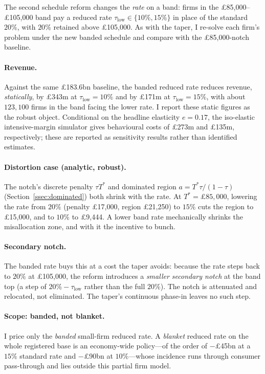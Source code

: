 The second schedule reform changes the \emph{rate} on a band: firms in the
\pounds85{,}000--\pounds105{,}000 band pay a reduced rate
$\tau_{\text{low}}\in\{10\%,15\%\}$ in place of the standard $20\%$, with $20\%$
retained above \pounds105{,}000. As with the taper, I re-solve each firm's
problem under the new banded schedule and compare with the \pounds85{,}000-notch
baseline.

\paragraph{Revenue.} Against the same \pounds183.6bn baseline, the banded reduced
rate reduces revenue, \emph{statically}, by \pounds343m at
$\tau_{\text{low}}=10\%$ and by \pounds171m at $\tau_{\text{low}}=15\%$, with
about $123{,}100$ firms in the band facing the lower rate. I report these static
figures as the robust object. Conditional on the headline elasticity $e=0.17$, the
iso-elastic intensive-margin simulator gives behavioural costs of \pounds273m and
\pounds135m, respectively; these are reported as sensitivity results rather than
identified estimates.

\paragraph{Distortion case (analytic, robust).} The notch's discrete penalty
$\tau T^{*}$ and dominated region $a=T^{*}\tau/(1-\tau)$
(Section~\ref{ssec:dominated}) both shrink with the rate. At
$T^{*}=\pounds85{,}000$, lowering the rate from $20\%$ (penalty \pounds17{,}000,
region \pounds21{,}250) to $15\%$ cuts the region to \pounds15{,}000, and to
$10\%$ to \pounds9{,}444. A lower band rate mechanically shrinks the misallocation
zone, and with it the incentive to bunch.

\paragraph{Secondary notch.} The banded rate buys this at a cost the taper avoids:
because the rate steps back to $20\%$ at \pounds105{,}000, the reform introduces a
\emph{smaller secondary notch} at the band top (a step of
$20\%-\tau_{\text{low}}$ rather than the full $20\%$). The notch is attenuated and
relocated, not eliminated. The taper's continuous phase-in leaves no such step.

\paragraph{Scope: banded, not blanket.} I price only the \emph{banded}
small-firm reduced rate. A \emph{blanket} reduced rate on the whole registered
base is an economy-wide policy---of the order of \(-\)\pounds45bn at a $15\%$
standard rate and \(-\)\pounds90bn at $10\%$---whose incidence runs through
consumer pass-through and lies outside this partial firm model.

